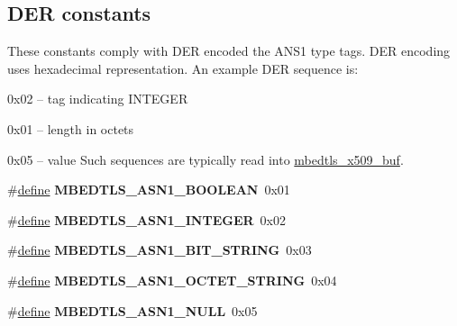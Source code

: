 \subsection*{D\+ER constants}
\label{_amgrpeab69e4214cba23802e5f50d9da845b8}%
These constants comply with D\+ER encoded the A\+N\+S1 type tags. D\+ER encoding uses hexadecimal representation. An example D\+ER sequence is\+:~\newline

\begin{DoxyItemize}
\item 0x02 -- tag indicating I\+N\+T\+E\+G\+ER
\item 0x01 -- length in octets
\item 0x05 -- value Such sequences are typically read into {\ttfamily \hyperlink{group__x509__module_ga4d02c9e8e4e2934555e0d132cd2976dc}{mbedtls\+\_\+x509\+\_\+buf}}. 
\end{DoxyItemize}\begin{DoxyCompactItemize}
\item 
\mbox{\label{group__asn1__module_ga1382980a474a765365d8f5c7bd63795a}} 
\#\hyperlink{structdefine}{define} {\bfseries M\+B\+E\+D\+T\+L\+S\+\_\+\+A\+S\+N1\+\_\+\+B\+O\+O\+L\+E\+AN}~0x01
\item 
\mbox{\label{group__asn1__module_ga6e8614f8937956c294fe791bc5ac6a7c}} 
\#\hyperlink{structdefine}{define} {\bfseries M\+B\+E\+D\+T\+L\+S\+\_\+\+A\+S\+N1\+\_\+\+I\+N\+T\+E\+G\+ER}~0x02
\item 
\mbox{\label{group__asn1__module_gafd5c5ecc822b7e2f4d2e64bf388fc559}} 
\#\hyperlink{structdefine}{define} {\bfseries M\+B\+E\+D\+T\+L\+S\+\_\+\+A\+S\+N1\+\_\+\+B\+I\+T\+\_\+\+S\+T\+R\+I\+NG}~0x03
\item 
\mbox{\label{group__asn1__module_ga080d1f82b0996a63c561541eb22a7d0f}} 
\#\hyperlink{structdefine}{define} {\bfseries M\+B\+E\+D\+T\+L\+S\+\_\+\+A\+S\+N1\+\_\+\+O\+C\+T\+E\+T\+\_\+\+S\+T\+R\+I\+NG}~0x04
\item 
\mbox{\label{group__asn1__module_gae26e36d787617e0b2dd067ccc342db0d}} 
\#\hyperlink{structdefine}{define} {\bfseries M\+B\+E\+D\+T\+L\+S\+\_\+\+A\+S\+N1\+\_\+\+N\+U\+LL}~0x05
\item 
\mbox{\label{group__asn1__module_gad87ad0570a31add4ecac6cc3694ca79a}} 

\end{DoxyCompactItemize}
